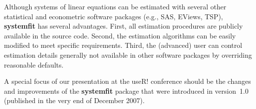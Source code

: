 \documentclass[12pt]{scrartcl}
\newcommand{\pkg}[1]{\mbox{\textbf{#1}}}
\newcommand{\proglang}[1]{\mbox{\textsf{#1}}}
\begin{document}
Although systems of linear equations can be estimated
with several other statistical and econometric software packages
(e.g., \proglang{SAS}, \proglang{EViews}, \proglang{TSP}),
\pkg{systemfit} has several advantages.
First, all estimation procedures are publicly available in the source code.
Second, the estimation algorithms can be easily modified to meet specific
requirements.
Third, the (advanced) user can control estimation details generally
not available in other software packages by overriding reasonable defaults.

A special focus of our presentation at the useR! conference
should be the changes and improvements of the \pkg{systemfit} package
that were introduced in version~1.0
(published in the very end of December 2007).


\end{document}
